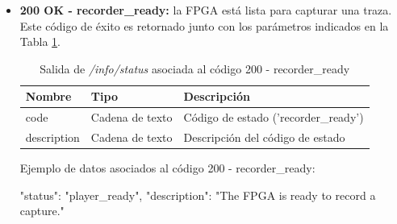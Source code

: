 \begin{itemize}
{\begin{minipage}{\textwidth}
\begin{code}[language=json]
{
  "status": "player_ready",
  "description": "The FPGA is ready to reproduce a capture."
}
\end{code}
\end{minipage}
}

\item{\textbf{200 OK - recorder\_ready:} la \gls{FPGA} está lista para capturar una \gls{traza}. Este código de éxito es retornado junto con los parámetros indicados en la Tabla \ref{extra:api:infostatus:recorderready}.
\begin{table}[H]
\centering
\begin{tabular}{|l|l|l|}
\hline
\rowcolor[HTML]{F5F5F5}
\textbf{Nombre}  & \textbf{Tipo}   & \textbf{Descripción}                 \\ \hline
code             & Cadena de texto & Código de estado ('recorder\_ready') \\ \hline
description      & Cadena de texto & Descripción del código de estado     \\ \hline
\end{tabular}
\caption{Salida de \textit{/info/status} asociada al código 200 - recorder\_ready}
\label{extra:api:infostatus:recorderready}
\end{table}
\begin{minipage}{\textwidth}
Ejemplo de datos asociados al código 200 - recorder\_ready:

\begin{code}[language=json]
{
  "status": "player_ready",
  "description": "The FPGA is ready to record a capture."
}
\end{code}
\end{minipage}
}


\end{itemize}
